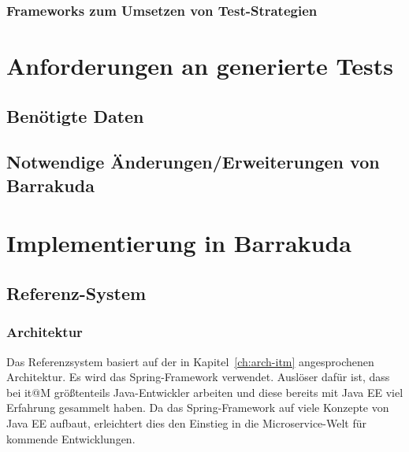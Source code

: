 \documentclass[12pt,a4paper,bibliography=totocnumbered,listof=totocnumbered]{scrartcl}
\begin{document}
\subsubsection{Frameworks zum Umsetzen von Test-Strategien}\label{ch:ms-test-frw}

\section{Anforderungen an generierte Tests}\label{ch:anforderungen-tests}

\subsection{Benötigte Daten}

\subsection{Notwendige Änderungen/Erweiterungen von Barrakuda}

\section{Implementierung in Barrakuda}\label{ch:implementierung}

\subsection{Referenz-System}

\subsubsection{Architektur}

Das Referenzsystem basiert auf der in Kapitel~\ref{ch:arch-itm} angesprochenen Architektur. Es wird das Spring-Framework verwendet. Auslöser dafür ist, dass bei it@M größtenteils Java-Entwickler arbeiten und diese bereits mit Java EE viel Erfahrung gesammelt haben. Da das Spring-Framework auf viele Konzepte von Java EE aufbaut, erleichtert dies den Einstieg in die Microservice-Welt für kommende Entwicklungen.
\end{document}

